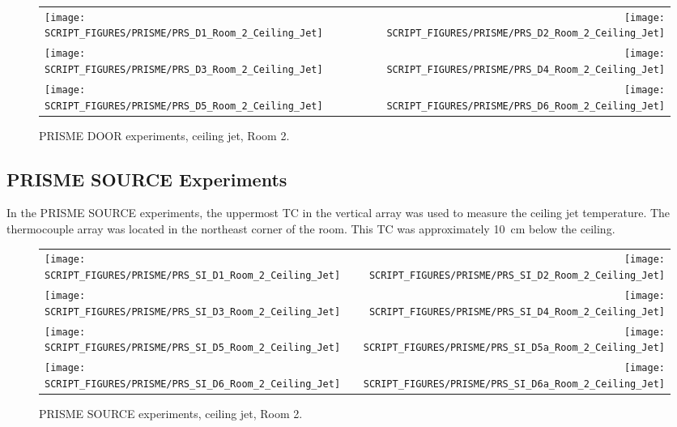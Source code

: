 \newpage

\begin{figure}[p]
\begin{tabular*}{\textwidth}{l@{\extracolsep{\fill}}r}
\texttt{[image: SCRIPT\_FIGURES/PRISME/PRS\_D1\_Room\_2\_Ceiling\_Jet]} &
\texttt{[image: SCRIPT\_FIGURES/PRISME/PRS\_D2\_Room\_2\_Ceiling\_Jet]} \\
\texttt{[image: SCRIPT\_FIGURES/PRISME/PRS\_D3\_Room\_2\_Ceiling\_Jet]} &
\texttt{[image: SCRIPT\_FIGURES/PRISME/PRS\_D4\_Room\_2\_Ceiling\_Jet]} \\
\texttt{[image: SCRIPT\_FIGURES/PRISME/PRS\_D5\_Room\_2\_Ceiling\_Jet]} &
\texttt{[image: SCRIPT\_FIGURES/PRISME/PRS\_D6\_Room\_2\_Ceiling\_Jet]}
\end{tabular*}
\caption[PRISME DOOR experiments, ceiling jet, Room 2]{PRISME DOOR experiments, ceiling jet, Room 2.}
\label{PRISME_Ceiling_Jet_Room_2}
\end{figure}

\clearpage


\subsection{PRISME SOURCE Experiments}

In the PRISME SOURCE experiments, the uppermost TC in the vertical array was used to measure the ceiling jet temperature. The thermocouple array was located in the northeast corner of the room. This TC was approximately 10~cm below the ceiling.

\begin{figure}[!h]
\begin{tabular*}{\textwidth}{l@{\extracolsep{\fill}}r}
\texttt{[image: SCRIPT\_FIGURES/PRISME/PRS\_SI\_D1\_Room\_2\_Ceiling\_Jet]} &
\texttt{[image: SCRIPT\_FIGURES/PRISME/PRS\_SI\_D2\_Room\_2\_Ceiling\_Jet]} \\
\texttt{[image: SCRIPT\_FIGURES/PRISME/PRS\_SI\_D3\_Room\_2\_Ceiling\_Jet]} &
\texttt{[image: SCRIPT\_FIGURES/PRISME/PRS\_SI\_D4\_Room\_2\_Ceiling\_Jet]} \\
\texttt{[image: SCRIPT\_FIGURES/PRISME/PRS\_SI\_D5\_Room\_2\_Ceiling\_Jet]} &
\texttt{[image: SCRIPT\_FIGURES/PRISME/PRS\_SI\_D5a\_Room\_2\_Ceiling\_Jet]} \\
\texttt{[image: SCRIPT\_FIGURES/PRISME/PRS\_SI\_D6\_Room\_2\_Ceiling\_Jet]} &
\texttt{[image: SCRIPT\_FIGURES/PRISME/PRS\_SI\_D6a\_Room\_2\_Ceiling\_Jet]}
\end{tabular*}
\caption[PRISME SOURCE experiments, ceiling jet, Room 2]{PRISME SOURCE experiments, ceiling jet, Room 2.}
\label{PRISME_SOURCE_Ceiling_Jet_Room_1}
\end{figure}

